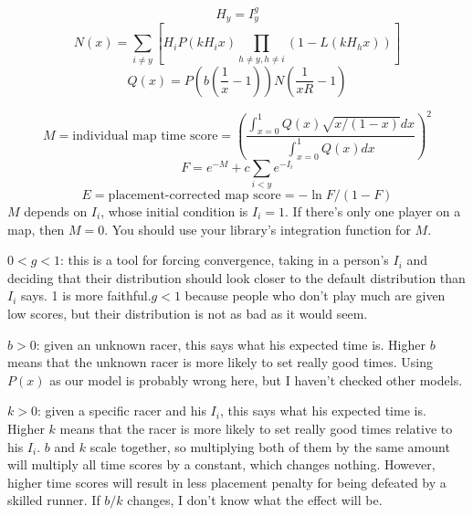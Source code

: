 \begin{equation}H_y = I_y^{g}\end{equation}
\begin{equation}N(x) = \sum_{i \ne y}\left[H_i P(k H_i x) \prod_{h \ne y, h \ne i} \left(1 - L(k H_h x)\right)\right]\end{equation}
\begin{equation}Q(x) = P\left(b\left(\frac1x - 1\right)\right) N\left(\frac1{xR} - 1\right)\end{equation}

\begin{equation}M = \text{individual map time score} = \left(\frac{\int_{x=0}^1 Q(x)\sqrt{x/(1-x)} dx}{\int_{x = 0}^1 Q(x) dx}\right)^2\end{equation}
\begin{equation}F = e^{-M} + c \sum_{i < y} e^{-I_i}\end{equation}
\begin{equation}E = \text{placement-corrected map score} = -\ln F / (1 - F)\end{equation}
$M$ depends on $I_i$, whose initial condition is $I_i = 1$. If there's only one player on a map, then $M=0$. You should use your library's integration function for $M$.

$0 < g < 1$: this is a tool for forcing convergence, taking in a person's $I_i$ and deciding that their distribution should look closer to the default distribution than $I_i$ says. 1 is more faithful.$g < 1$ because people who don't play much are given low scores, but their distribution is not as bad as it would seem.

$b > 0$: given an unknown racer, this says what his expected time is. Higher $b$ means that the unknown racer is more likely to set really good times. Using $P(x)$ as our model is probably wrong here, but I haven't checked other models.

$k > 0$: given a specific racer and his $I_i$, this says what his expected time is. Higher $k$ means that the racer is more likely to set really good times relative to his $I_i$. $b$ and $k$ scale together, so multiplying both of them by the same amount will multiply all time scores by a constant, which changes nothing. However, higher time scores will result in less placement penalty for being defeated by a skilled runner. If $b/k$ changes, I don't know what the effect will be.

